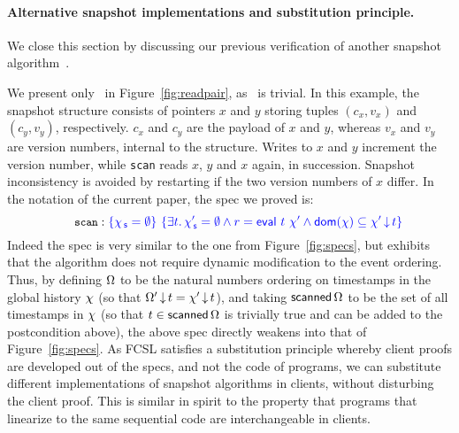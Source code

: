 
\paragraph{Alternative snapshot
  implementations and substitution principle.}

We close this section by discussing our previous
verification of another snapshot algorithm~\cite{SergeyNB+ESOP15}. 


%
\noindent
%
We present only \jyscan\ in Figure~\ref{fig:readpair}, as \jywrite\ is
trivial.  In this example, the snapshot structure consists of pointers
$x$ and $y$ storing tuples $(c_x, v_x)$ and $(c_y, v_y)$,
respectively. $c_x$ and $c_y$ are the payload of $x$ and $y$, whereas
$v_x$ and $v_y$ are version numbers, internal to the structure. Writes
to $x$ and $y$ increment the version number, while {\tt scan} reads $x$, $y$
and $x$ again, in succession. Snapshot inconsistency is avoided by
restarting if the two version numbers of $x$ differ. In the notation
of the current paper, the spec we proved is:
\[
\esc{scan} : \tsPos{\{\histS = \hempty\}}\ \tsPos{\{\exists t\ldot \histS' = \hempty \wedge r = \eval\ t\ \histP \wedge \dom{\hist} \subseteq \ideal{\histP}{t}\}}
\]
Indeed the spec is very similar to the one from
Figure~\ref{fig:specs}, but exhibits that the algorithm does not
require dynamic modification to the event ordering. Thus, by defining
$\Omega$ to be the natural numbers ordering on timestamps in the
global history $\chi$ (so that $\Omega'\,{\downarrow}\,t =
\chi'\,{\downarrow}\,t$), and taking $\mathsf{scanned}\,\Omega$ to be the set
of all timestamps in $\chi$ (so that $t \in \mathsf{scanned}\,\Omega$
is trivially true and can be added to the postcondition above), the
above spec directly weakens into that of Figure~\ref{fig:specs}. As
FCSL satisfies a substitution principle whereby client proofs are
developed out of the specs, and not the code of programs, we can
substitute different implementations of snapshot algorithms in
clients, without disturbing the client proof. This is similar in
spirit to the property that programs that linearize to the same
sequential code are interchangeable in clients.
